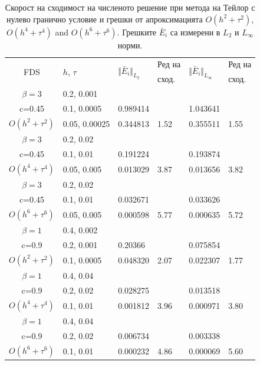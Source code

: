 \documentclass{article}
\begin{document}
\begin{table}[ht]
\begin{tabular}{||c|l|ll|ll||}
      \multirow{2  }{*}{FDS}        & \multirow{2  }{*}{$h$, $\tau$}  &	\multirow{2  }{*}{  $\Vert \bar E_i \Vert_{L_2} $ } 	&Ред на & \multirow{2  }{*}{  $\Vert \bar E_i \Vert_{L_\infty}$ }	&Ред на   \\
	                                        &                                                &    										&  сход. & 										& сход. \\
   			\hline 
					\hline 
  $\beta=3$                &0.2, 0.001          &              &              &                     &      \\
   c=0.45                     &0.1, 0.0005          &0.989414 &            &1.043641    &       \\
     $O(h^2 + \tau^ 2)$ &0.05, 0.00025   & 0.344813 & 1.52    &0.355511    &  1.55      \\
			\hline 
  $\beta=3$               &0.2, 0.02       &              &            &                     &      \\
   c=0.45                    &0.1, 0.01      &0.191224 &            &0.193874    &       \\
     $O(h^4+ \tau^4)$ &0.05, 0.005&0.013029 & 3.87   &0.013656     &3.82       \\
			\hline 
  $\beta=3$               &0.2, 0.02       &                &            &                     &      \\
     c=0.45                 &0.1, 0.01        &0.032671 &            &  0.033626    &       \\
     $O(h^6+ \tau^6)$ &0.05, 0.005 &0.000598 &5.77     & 0.000635    & 5.72       \\
	   \hline
			\hline 
       $\beta=1$       &0.4, 0.002        &             &            &           &   \\
                  c=0.9    &0.2, 0.001       &  0.20366   &            &0.075854 &   \\
  $O(h^2+ \tau^2)$ &0.1, 0.0005   &0.048320   &2.07  &0.022307  & 1.77 \\
			\hline
      $\beta=1$               &0.4, 0.04    &            &               &             &    \\
       c=0.9                     &0.2, 0.02     & 0.028275   &        &  0.013518   &   \\
       $O(h^4+ \tau^4)$ &0.1, 0.01   &0.001812 & 3.96  & 0.000971  & 3.80  \\
    \hline
  $\beta=1$     &0.4, 0.04   &            &          &                  &      \\
      c=0.9                    &0.2, 0.02   &0.006734 &           & 0.003338      &       \\
     $O(h^6+ \tau^6)$ &0.1, 0.01 & 0.000232 &4.86 & 0.000069  & 5.60        \\
	   \hline
			\hline 
		\end{tabular}
		\caption{Скорост на сходимост на численото решение при метода на Тейлор с нулево гранично условие и грешки от апроксимацията $O(h^{2} + \tau^2 )$, $O(h^{4} + \tau^4 )$ and $O(h^{6} + \tau^6 )$. Грешките $\bar E_i$ са измерени в $L_2$ и $L_\infty$ норми.}
\label{tableA}
\end{table}
\end{document}

